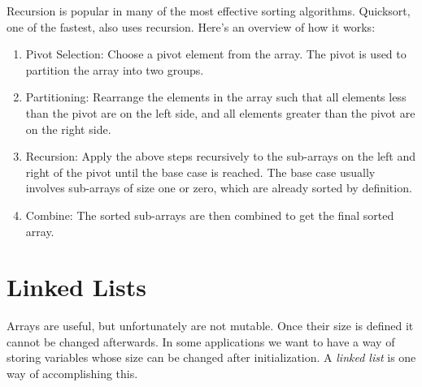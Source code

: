 \documentclass[nobib]{tufte-handout}
\begin{document}
Recursion is popular in many of the most effective sorting algorithms. 
Quicksort, one of the fastest, also uses recursion. Here's an 
overview of how it works: 
\begin{enumerate}
   \item Pivot Selection: Choose a pivot element from the array. 
   The pivot is used to partition the array into two groups.

   \item Partitioning: Rearrange the elements in the array 
   such that all elements less than the pivot are on the left 
   side, and all elements greater than the pivot are on the right side.

   \item Recursion: Apply the above steps 
   recursively to the sub-arrays on the left and 
   right of the pivot until the base case is reached. 
   The base case usually involves sub-arrays of size 
   one or zero, which are already sorted by definition.

   \item Combine: The sorted sub-arrays are then 
   combined to get the final sorted array.
\end{enumerate}

\section{Linked Lists}
Arrays are useful, but unfortunately are not mutable. 
Once their size is defined it cannot be changed afterwards. 
In some applications we want to have a way of storing variables
whose size can be changed after initialization. A \emph{linked list}
is one way of accomplishing this. 
\end{document}

